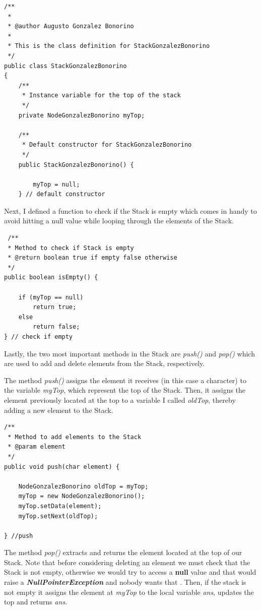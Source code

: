 \documentclass[letterpaper, 10pt]{article}
\begin{document}
\begin{lstlisting}
/**
 * 
 * @author Augusto Gonzalez Bonorino
 *
 * This is the class definition for StackGonzalezBonorino
 */
public class StackGonzalezBonorino 
{
	/**
	 * Instance variable for the top of the stack
	 */
	private NodeGonzalezBonorino myTop;
	
	/**
	 * Default constructor for StackGonzalezBonorino
	 */
	public StackGonzalezBonorino() {
		
		myTop = null;
	} // default constructor

\end{lstlisting}

Next, I defined a function to check if the Stack is empty which comes in handy to avoid hitting a null value while looping through the elements of the Stack.

\begin{lstlisting}
 /**
 * Method to check if Stack is empty
 * @return boolean true if empty false otherwise
 */
public boolean isEmpty() {
	
	if (myTop == null)
		return true;
	else
		return false;
} // check if empty
\end{lstlisting}

Lastly, the two most important methods in the Stack are \textit{push()} and \textit{pop()} which are used to add and delete elements from the Stack, respectively.

The method \textit{push()} assigns the element it receives (in this case a character) to the variable \textit{myTop}, which represent the top of the Stack. Then, it assigns the element previously located at the top to a variable I called \textit{oldTop}, thereby adding a new element to the Stack.

\begin{lstlisting}
/**
 * Method to add elements to the Stack
 * @param element
 */
public void push(char element) {
	
	NodeGonzalezBonorino oldTop = myTop;
	myTop = new NodeGonzalezBonorino();
	myTop.setData(element);
	myTop.setNext(oldTop);
	
} //push
\end{lstlisting}

The method \textit{pop()} extracts and returns the element located at the top of our Stack. Note that before considering deleting an element we must check that the Stack is not empty, otherwise we would try to access a \textbf{null} value and that would raise a \textit{\textbf{NullPointerException}} and nobody wants that \smiley{}. Then, if the stack is not empty it assigns the element at \textit{myTop} to the local variable \textit{ans}, updates the top and returns \textit{ans}.
\end{document}
